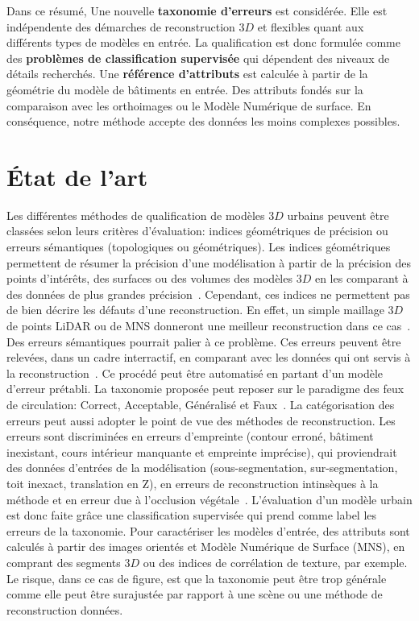 \documentclass[a4paper,french]{article}
\begin{document}
    Dans ce résumé, Une nouvelle \textbf{taxonomie d'erreurs} est considérée. Elle est indépendente des démarches de reconstruction $3D$ et flexibles quant aux différents types de modèles en entrée. La qualification est donc formulée comme des \textbf{problèmes de classification supervisée} qui dépendent des niveaux de détails recherchés. Une \textbf{référence d'attributs} est calculée à partir de la géométrie du modèle de bâtiments en entrée. Des attributs fondés sur la comparaison avec les orthoimages ou le Modèle Numérique de surface. En conséquence, notre méthode accepte des données les moins complexes possibles.

    \section{\'Etat de l'art}

    Les différentes méthodes de qualification de modèles $3D$ urbains peuvent être classées selon leurs critères d'évaluation: indices géométriques de précision ou erreurs sémantiques (topologiques ou géométriques). Les indices géométriques permettent de résumer la précision d'une modélisation à partir de la précision des points d'intérêts, des surfaces ou des volumes des modèles $3D$ en les comparant à des données de plus grandes précision~\cite{Zeng2014, Kaartinen2005}. Cependant, ces indices ne permettent pas de bien décrire les défauts d'une reconstruction. En effet, un simple maillage $3D$ de points LiDAR ou de MNS donneront une meilleur reconstruction dans ce cas~\cite{rottensteiner2014results}. Des erreurs sémantiques pourrait palier à ce problème. Ces erreurs peuvent être relevées, dans un cadre interractif, en comparant avec les données qui ont servis à la reconstruction~\cite{OudeElberink2010}. Ce procédé peut être automatisé en partant d'un modèle d'erreur prétabli. La taxonomie proposée peut reposer sur le paradigme des feux de circulation: Correct, Acceptable, Généralisé et Faux~\cite{Boudet2006}. La catégorisation des erreurs peut aussi adopter le point de vue des méthodes de reconstruction. Les erreurs sont discriminées en erreurs d'empreinte (contour erroné, bâtiment inexistant, cours intérieur manquante et empreinte imprécise), qui proviendrait des données d'entrées de la modélisation (sous-segmentation, sur-segmentation, toit inexact, translation en Z), en erreurs de reconstruction intinsèques à la méthode et en erreur due à l'occlusion végétale~\cite{Michelin2013}. L'évaluation d'un modèle urbain est donc faite grâce une classification supervisée qui prend comme label les erreurs de la taxonomie. Pour caractériser les modèles d'entrée, des attributs sont calculés à partir des images orientés et Modèle Numérique de Surface (MNS), en comprant des segments $3D$ ou des indices de corrélation de texture, par exemple. Le risque, dans ce cas de figure, est que la taxonomie peut être trop générale comme elle peut être surajustée par rapport à une scène ou une méthode de reconstruction données.
\end{document}
